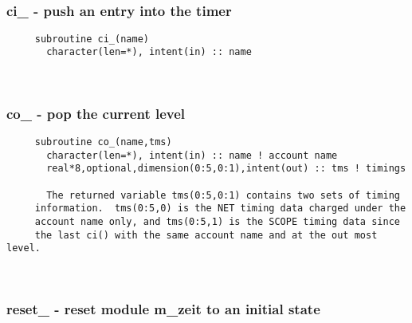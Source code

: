  
\mbox{}\hrulefill\ 
 
  \subsubsection{ci\_ - push an entry into the timer}

\begin{verbatim} 
     subroutine ci_(name)
       character(len=*), intent(in) :: name
 \end{verbatim}%
 
 
\mbox{}\hrulefill\ 
 
  \subsubsection{co\_ - pop the current level}

\begin{verbatim} 
     subroutine co_(name,tms)
       character(len=*), intent(in) :: name	! account name
       real*8,optional,dimension(0:5,0:1),intent(out) :: tms ! timings
 
       The returned variable tms(0:5,0:1) contains two sets of timing
     information.  tms(0:5,0) is the NET timing data charged under the
     account name only, and tms(0:5,1) is the SCOPE timing data since
     the last ci() with the same account name and at the out most level.\end{verbatim}%
 
 
\mbox{}\hrulefill\ 
 

  \subsubsection{reset\_ - reset module m\_zeit to an initial state}

